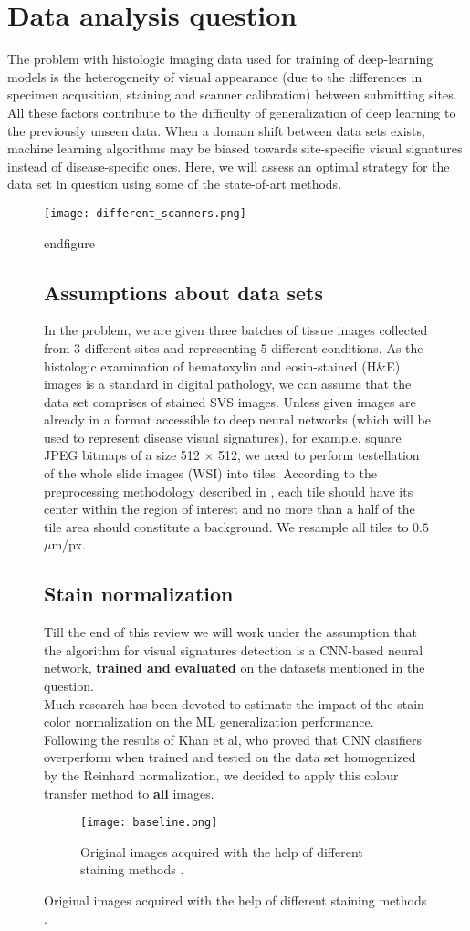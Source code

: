 \documentclass[11pt]{article}
\begin{document}
\section{Data analysis question}
The problem with histologic imaging data used for training of deep-learning models is the heterogeneity of visual appearance (due to the differences in specimen acqusition, staining and scanner calibration) between submitting sites. 
All these factors contribute to the difficulty of generalization of deep learning to the previously unseen data. When a domain shift between data sets exists, machine learning algorithms may be biased towards site-specific visual signatures instead of disease-specific ones. 
Here, we will assess an optimal strategy for the data set in question using some of the state-of-art methods.
\begin{figure}[h]
\centering
\texttt{[image: different\_scanners.png]}
				\caption{Tissue patches ilustrating scanner-induced domain gap \cite{auber21}}
end{figure}
\subsection{Assumptions about data sets}
In the problem, we are given three batches of tissue images collected from $3$ different sites and representing $5$ different conditions.
As the histologic examination of hematoxylin and eosin-stained (H\&E) images is a standard in digital pathology, we can assume that the data set comprises of stained SVS images.
Unless given images are already in a format accessible to deep neural networks (which will be used to represent disease visual signatures), for example, square JPEG bitmaps of a size 512 $\times$ 512,
we need to perform testellation of the whole slide images (WSI) into tiles. According to the preprocessing methodology described in \cite{aachen20}, each tile should have its center within 
the region of interest and no more than a half of the tile area should constitute a background. We resample all tiles to $0.5$ $\mu$m/px.
\subsection{Stain normalization}
Till the end of this review we will work under the assumption that the algorithm for visual signatures detection is a CNN-based neural network, \textbf{trained and evaluated} on the datasets mentioned in the question.
\\ Much research has been devoted to estimate the impact of the stain color normalization on the ML generalization performance. Following the results of Khan et al, who proved that CNN clasifiers overperform when 
trained and tested on the data set homogenized by the Reinhard normalization, we decided to apply this colour transfer method to \textbf{all} images.
\begin{figure}[H]
\centering
\texttt{[image: baseline.png]}
				\caption{Original images acquired with the help of different staining methods \cite{khan}.}
\end{figure}


\end{figure}
\end{document}
